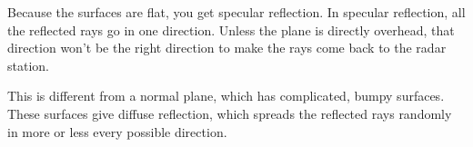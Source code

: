 Because the surfaces are flat, you get specular reflection.
In specular reflection, all the reflected rays go in one
direction. Unless the plane is directly overhead, that direction
won't be the right direction to make the rays come back to the
radar station.


This is different from a normal plane, which has complicated,
bumpy surfaces. These surfaces give diffuse reflection, which
spreads the reflected rays randomly in more or less every 
possible direction.
